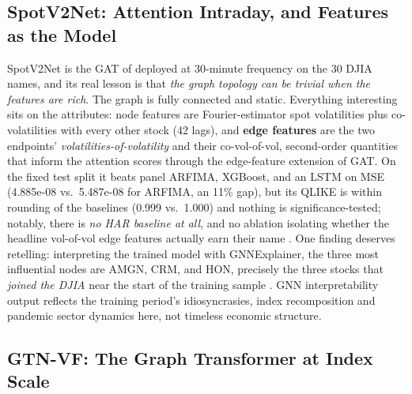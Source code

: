 \subsection{SpotV2Net: Attention Intraday, and Features as the Model}\label{sec:gnn:spotv2net}

SpotV2Net \citep{BriniToscano2024} is the GAT of  deployed at 30-minute frequency on the 30 DJIA names, and its real lesson is that \emph{the graph topology can be trivial when the features are rich}. The graph is fully connected and static. Everything interesting sits on the attributes: node features are Fourier-estimator spot volatilities plus co-volatilities with every other stock (42 lags), and \textbf{edge features} are the two endpoints' \emph{volatilities-of-volatility} and their co-vol-of-vol, second-order quantities that inform the attention scores through the edge-feature extension of GAT. On the fixed test split it beats panel ARFIMA, XGBoost, and an LSTM on MSE (4.885e-08 vs.\ 5.487e-08 for ARFIMA, an 11\% gap), but its QLIKE is within rounding of the baselines (0.999 vs.\ 1.000) and nothing is significance-tested; notably, there is \emph{no HAR baseline at all}, and no ablation isolating whether the headline vol-of-vol edge features actually earn their name \citep[Table~2, p.~16]{BriniToscano2024}. One finding deserves retelling: interpreting the trained model with GNNExplainer, the three most influential nodes are AMGN, CRM, and HON, precisely the three stocks that \emph{joined the DJIA} near the start of the training sample \citep[\S7.3]{BriniToscano2024}. GNN interpretability output reflects the training period's idiosyncrasies, index recomposition and pandemic sector dynamics here, not timeless economic structure.

\subsection{GTN-VF: The Graph Transformer at Index Scale}\label{sec:gnn:gtnvf}

